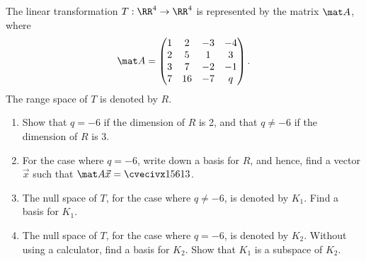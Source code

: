 \begin{problem}
    The linear transformation $T : \RR^4 \to \RR^4$ is represented by the matrix $\mat A$, where \[\mat A = \begin{pmatrix}1 & 2 & -3 & -4 \\ 2 & 5 & 1 & 3 \\ 3 & 7 & -2 & -1 \\ 7 & 16 & -7 & q\end{pmatrix}.\] The range space of $T$ is denoted by $R$.

    \begin{enumerate}
        \item Show that $q = -6$ if the dimension of $R$ is 2, and that $q \neq -6$ if the dimension of $R$ is 3.
        \item For the case where $q = -6$, write down a basis for $R$, and hence, find a vector $\vec x$ such that $\mat A \vec x = \cvecivx156{13}$.
        \item The null space of $T$, for the case where $q \neq -6$, is denoted by $K_1$. Find a basis for $K_1$.
        \item The null space of $T$, for the case where $q = -6$, is denoted by $K_2$. Without using a calculator, find a basis for $K_2$. Show that $K_1$ is a subspace of $K_2$.
    \end{enumerate}
\end{problem}
